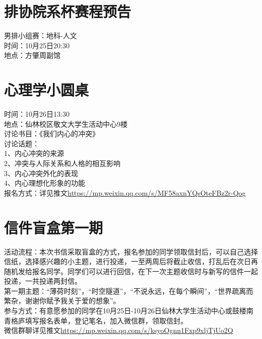 \documentclass[letterpaper, 12pt]{article}
\begin{document}
\begin{multicols}{2}
\section{排协院系杯赛程预告}
男排小组赛：地科-人文\\
时间：10月25日20:30\\
地点：方肇周副馆\\
\section{心理学小圆桌}
时间：10月26日13:30\\
地点：仙林校区敬文大学生活动中心9楼\\
讨论书目：《我们内心的冲突》\\
讨论话题：\\
1、内心冲突的来源\\
2、冲突与人际关系和人格的相互影响\\
3、内心冲突外化的表现\\
4、内心理想化形象的功能\\
报名方式：详见推文\url{https://mp.weixin.qq.com/s/MF58axnYQsOteFBz2r-Qog}
\section{信件盲盒第一期}
活动流程：本次书信采取盲盒的方式，报名参加的同学领取信封后，可以自己选择信纸，选择感兴趣的小主题，进行投递，一至两周后将截止收信，打乱后在次日再随机发给报名同学。同学们可以进行回信，在下一次主题收信时与新写的信件一起投递，一共投递两封信。\\
第一期主题：“薄荷时刻”，“时空隧道”，“不说永远，在每个瞬间”，“世界疏离而繁杂，谢谢你赋予我关于爱的想象”。\\
参与方式：有意愿参加的同学在10月25日-10月26日仙林大学生活动中心或鼓楼南青格庐填写报名表单，登记笔名，加入微信群，领取信封。\\
微信群聊详见推文\url{https://mp.weixin.qq.com/s/ksyoOgnn1Fxp9xljTjUo2Q}

\end{multicols}
\end{document}
